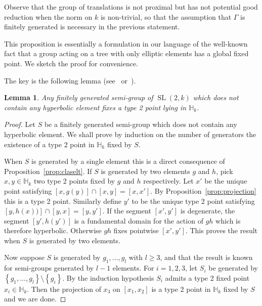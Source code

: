 \documentclass[11pt]{article}
\newtheorem{lemm}[theo]{Lemma}
\theoremstyle{definition}
\numberwithin{equation}{section}
\numberwithin{figure}{section}
\numberwithin{table}{section}
\DeclareMathOperator{\SL}{SL}
\newcommand{\hh}{\mathbb{H}}
\newcommand{\set}[1]{\left\{#1\right\}}
\begin{document}
Observe that the group of translations is not proximal but has not potential good reduction when the norm on $k$ is non-trivial, so that the assumption that $\Gamma$ is finitely generated is necessary in the previous statement.


This proposition is essentially a formulation in our language of the well-known fact that a group acting on a tree with only elliptic elements has a global fixed point. We sketch the proof for convenience.

The key is the following lemma (see~\cite[Lem.~10.4]{kapovich} or~\cite[Lem.~40]{otal}).

\begin{lemm}\label{lem:semi group}
Any finitely generated semi-group of $\SL(2,k)$ which does not contain any hyperbolic element fixes a type 2 point lying in $\hh_k$.
\end{lemm}

\begin{proof}
Let $S$ be a finitely generated semi-group which does not contain any hyperbolic element. We shall prove by induction on the number of generators the existence of a type 2 point in $\hh_k$ fixed by $S$.

When $S$ is generated by a single element this is a direct consequence of Proposition~\ref{prop:claselt}. If $S$ is generated by two elements $g$ and $h$, pick $x,y\in \hh_k$ two type 2 points fixed by $g$ and $h$ respectively. Let $x'$ be the unique point satisfying $[x,g(y)] \cap [x,y] = [x,x']$. By Proposition~\ref{prop:projection} this is a type 2 point. Similarly define $y'$ to be the unique type 2 point satisfying $[y,h(x))] \cap [y,x] = [y,y']$. If the segment $[x',y']$ is degenerate, the segment $[y',h(y')]$ is a fundamental domain for the action of $gh$ which is therefore hyperbolic. Otherwise $gh$ fixes pointwise $[x',y']$. This proves the result when $S$ is generated by two elements.

Now suppose $S$ is generated by $g_1, \ldots, g_l$ with $l\ge 3$, and that the result is known for semi-groups generated by $l-1$ elements. For $i =1,2,3$, let $S_i$ be generated by $\set{ g_1, \ldots, g_l}\setminus \set{g_i}$. By the induction hypothesis $S_i$ admits a type 2 fixed point $x_i \in \hh_k$. Then the projection of $x_3$ on $[x_1, x_2]$ is a type 2 point in $\hh_k$ fixed by $S$ and we are done.
\end{proof}
\end{document}
